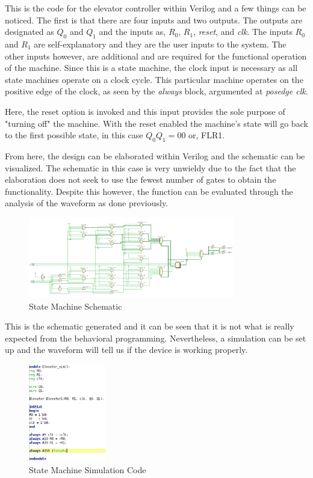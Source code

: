 \documentclass[12pt]{article}
\begin{document}
    \par This is the code for the elevator controller within Verilog and a few
    things can be noticed. The first is that there are four inputs and two
    outputs. The outputs are designated as $Q_0$ and $Q_1$ and the inputs as,
    $R_0$, $R_1$, \textit{reset}, and \textit{clk}. The inputs $R_0$ and $R_1$
    are self-explanatory and they are the user inputs to the system. The other
    inputs however, are additional and are required for the functional operation
    of the machine. Since this is a state machine, the clock input is necessary
    as all state machines operate on a clock cycle. This particular machine
    operates on the positive edge of the clock, as seen by the \textit{always}
    block, argumented at \textit{posedge clk}.
    \par Here, the reset option is invoked and this input provides the sole
    purpose of "turning off" the machine. With the reset enabled the machine's
    state will go back to the first possible state, in this case $Q_0 Q_1 = 00$
    or, FLR1.
    \par From here, the design can be elaborated within Verilog and the
    schematic can be visualized. The schematic in this case is very unwieldy due
    to the fact that the elaboration does not seek to use the fewest number of
    gates to obtain the functionality. Despite this however, the function can be
    evaluated through the analysis of the waveform as done previously.
    \begin{figure}[h]
        \centering
        \includegraphics[width=0.8\textwidth]{State Machine Schematic.png}
        \caption{State Machine Schematic}
    \end{figure}
    \par This is the schematic generated and it can be seen that it is not what
    is really expected from the behavioral programming. Nevertheless, a
    simulation can be set up and the waveform will tell us if the device is
    working properly.
    \begin{figure}[h]
        \centering
        \includegraphics[width=0.3\textwidth]{State Machine Simulation Code.png}
        \caption{State Machine Simulation Code}
    \end{figure}
\end{document}
